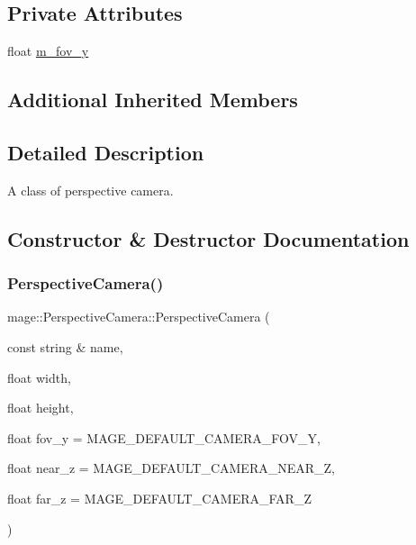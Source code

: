 \subsection*{Private Attributes}
\begin{DoxyCompactItemize}
\item 
float \hyperlink{classmage_1_1_perspective_camera_abdcf1a0cdd247e0f7e14e70898678af6}{m\+\_\+fov\+\_\+y}
\end{DoxyCompactItemize}
\subsection*{Additional Inherited Members}


\subsection{Detailed Description}
A class of perspective camera. 

\subsection{Constructor \& Destructor Documentation}
\hypertarget{classmage_1_1_perspective_camera_a1e0d1c4d57812b9629ab38b69bc2ce6b}{}\label{classmage_1_1_perspective_camera_a1e0d1c4d57812b9629ab38b69bc2ce6b} 
\subsubsection{\texorpdfstring{Perspective\+Camera()}{PerspectiveCamera()}\hspace{0.1cm}{\footnotesize\ttfamily [1/2]}}
{\footnotesize\ttfamily mage\+::\+Perspective\+Camera\+::\+Perspective\+Camera (\begin{DoxyParamCaption}\item[{const string \&}]{name,  }\item[{float}]{width,  }\item[{float}]{height,  }\item[{float}]{fov\+\_\+y = {\ttfamily MAGE\+\_\+DEFAULT\+\_\+CAMERA\+\_\+FOV\+\_\+Y},  }\item[{float}]{near\+\_\+z = {\ttfamily MAGE\+\_\+DEFAULT\+\_\+CAMERA\+\_\+NEAR\+\_\+Z},  }\item[{float}]{far\+\_\+z = {\ttfamily MAGE\+\_\+DEFAULT\+\_\+CAMERA\+\_\+FAR\+\_\+Z} }\end{DoxyParamCaption})}

